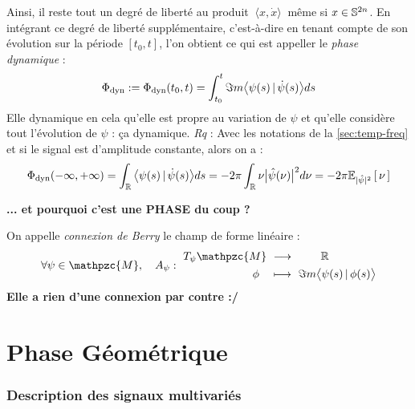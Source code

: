 \begin{definition}\label{def:phase_dyn}
	Ainsi, il reste tout un degré de liberté au produit $\ \langle x, \dot{x} \rangle\ $ même si $x\in\S^{2n}$. En intégrant ce degré de liberté supplémentaire, c'est-à-dire en tenant compte de son évolution sur la période $[t_0,t]$, l'on obtient ce qui est appeller le \emph{phase dynamique} :
	\[\phased \defeq \phased(t_0,t) = \int_{t_0}^t \Im m \big\langle \psi(s) \, |\, \dot{\psi}(s) \big\rangle ds\]
	Elle dynamique en cela qu'elle est propre au variation de $\psi$ et qu'elle considère tout l'évolution de $\psi$ : ça dynamique.
	\textit{Rq} : Avec les notations de la \cref{sec:temp-freq} et si le signal est d'amplitude constante, alors on a :
	 \[\phased(-\infty, +\infty) = \int_\R \big\langle \psi(s) \, |\, \dot{\psi}(s) \big\rangle ds = -2\pi\int_\R \nu\big|\hat{\psi}(\nu)\big|^2 d\nu = - 2\pi \esp[|\hat{\psi}|^2]{\nu}\]
	
	\textbf{... et pourquoi c'est une PHASE du coup ?}
\end{definition}


\begin{definition}\label{def:berry_connx}
	On appelle \emph{connexion de Berry} le champ de forme linéaire :
	\begin{equation}\label{eq:berry_connx}
		\forall \psi\in\mathpzc{M},\quad A_\psi :\ \begin{aligned} T_\psi\mathpzc{M}\ &\lr\qquad\ \R \\ \phi\quad &\longmapsto\ \Im m \big\langle \psi(s) \, |\, \phi(s) \big\rangle
		\end{aligned}
	\end{equation}
	\textbf{Elle a rien d'une connexion par contre :/}
\end{definition}





\setcounter{section}{0}
\setcounter{figure}{0}
\setcounter{lstlisting}{0}

\part{Phase Géométrique}

\section{Description des signaux multivariés}\label{sec:bases}





